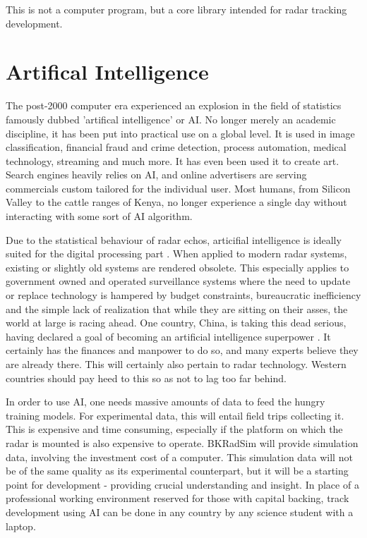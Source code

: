 \documentclass[letterpaper]{book}
\begin{document}
This is not a computer program, but a core library intended for radar tracking development.


\section{Artifical Intelligence}
The post-2000 computer era experienced an explosion in the field of statistics famously dubbed 'artifical intelligence' or AI. No longer merely an academic discipline, it has been put into practical use on a global level. It is used in image classification, financial fraud and crime detection, process automation, medical technology, streaming and much more. It has even been used it to create art. Search engines heavily relies on AI, and online advertisers are serving commercials custom tailored for the individual user. Most humans, from Silicon Valley to the cattle ranges of Kenya, no longer experience a single day without interacting with some sort of AI algorithm.

Due to the statistical behaviour of radar echos, articifial intelligence is ideally suited for the digital processing part \cite{ref:li}. When applied to modern radar systems, existing or slightly old systems are rendered obsolete. This especially applies to government owned and operated surveillance systems where the need to update or replace technology is hampered by budget constraints, bureaucratic inefficiency and the simple lack of realization that while they are sitting on their asses, the world at large is racing ahead. One country, China, is taking this dead serious, having declared a goal of becoming an artificial intelligence superpower \cite{ref:wester}. It certainly has the finances and manpower to do so, and many experts believe they are already there. This will certainly also pertain to radar technology. Western countries should pay heed to this so as not to lag too far behind. 

In order to use AI, one needs massive amounts of data to feed the hungry training models. For experimental data, this will entail field trips collecting it. This is expensive and time consuming, especially if the platform on which the radar is mounted is also expensive to operate. BKRadSim will provide simulation data, involving the investment cost of a computer. This simulation data will not be of the same quality as its experimental counterpart, but it will be a starting point for development - providing crucial understanding and insight. In place of a professional working environment reserved for those with capital backing, track development using AI can be done in any country by any science student with a laptop. 
\end{document}
